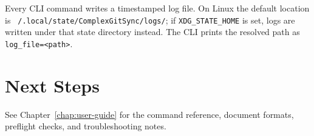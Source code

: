 Every CLI command writes a timestamped log file. On Linux the default location
is \texttt{~/.local/state/ComplexGitSync/logs/}; if
\texttt{XDG\_STATE\_HOME} is set, logs are written under that state directory
instead. The CLI prints the resolved path as \texttt{log\_file=<path>}.

\section{Next Steps}

See Chapter~\ref{chap:user-guide} for the command reference, document formats,
preflight checks, and troubleshooting notes.
